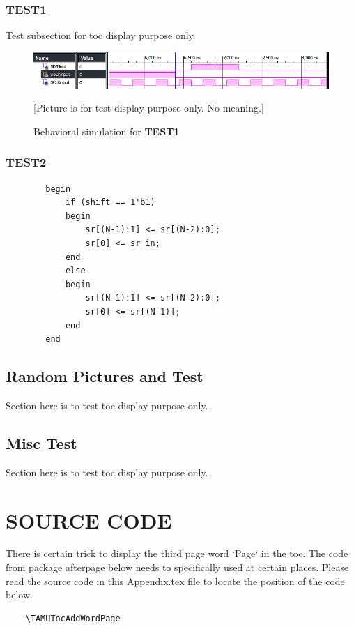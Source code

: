 \subsection{TEST1}
Test subsection for toc display purpose only.

\begin{figure}[!hbp]
\begin{center}
\includegraphics[width=\textwidth]{graphic/TESTOUT3_2bit_2.bmp}
\caption{Behavioral simulation for \textbf{TEST1}}
\label{fig:behaviorSimTest1}
{\small [Picture is for test display purpose only. No meaning.]}
\end{center}
\end{figure}


\subsection{TEST2}
\begin{verbatim}
		begin
			if (shift == 1'b1)
			begin
				sr[(N-1):1] <= sr[(N-2):0];
				sr[0] <= sr_in;				
			end
			else
			begin
				sr[(N-1):1] <= sr[(N-2):0];
				sr[0] <= sr[(N-1)];
			end
		end
\end{verbatim}

\section{Random Pictures and Test}
Section here is to test toc display purpose only.
\section{Misc Test}
Section here is to test toc display purpose only.


\chapter{SOURCE CODE \label{cha:appendixB}}

There is certain trick to display the third page word `Page` in the toc. The code from package {afterpage} below needs to specifically used at certain places. Please read the source code in this Appendix.tex file to locate the position of the code below.
 
\begin{verbatim}
	\TAMUTocAddWordPage
\end{verbatim}

